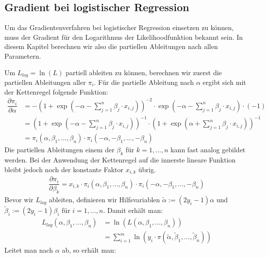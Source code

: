 \subsection{Gradient bei logistischer Regression}
\label{subsection:2:2:2}

Um das Gradientenverfahren bei logistischer Regression einsetzen zu können, muss der Gradient für den Logarithmus der Likelihoodfunktion bekannt sein. In diesem Kapitel berechnen wir also die partiellen Ableitungen nach allen Parametern.

Um $L_{log} = \ln(L)$ partiell ableiten zu können, berechnen wir zuerst die partiellen Ableitungen aller $\pi_i$. Für die partielle Ableitung nach $\alpha$ ergibt sich mit der Kettenregel folgende Funktion:
\begin{align*}
    \dfrac{\partial \pi_i}{\partial \alpha} &= - \left( 1 + \exp \left(- \alpha - \sum_{j=1}^n \beta_j \cdot x_{i, j} \right) \right)^{-2} \cdot \exp \left(- \alpha - \sum_{j=1}^n \beta_j \cdot x_{i, j} \right) \cdot (-1) \\
    &= \left( 1 + \exp \left(- \alpha - \sum_{j=1}^n \beta_j \cdot x_{i, j} \right) \right)^{-1} \cdot \left( 1 + \exp \left(\alpha + \sum_{j=1}^n \beta_j \cdot x_{i, j} \right) \right)^{-1} \\
    &= \pi_i(\alpha, \beta_1, \dots, \beta_n) \cdot \pi_i(- \alpha, - \beta_1, \dots, - \beta_n)
\end{align*}
Die partiellen Ableitungen einem der $\beta_k$ für $k = 1, \dots, n$ kann fast analog gebildet werden. Bei der Anwendung der Kettenregel auf die innerste lineare Funktion bleibt jedoch noch der konstante Faktor $x_{i, k}$ übrig.
\begin{align*}
    \dfrac{\partial \pi_i}{\partial \beta_k} = x_{i, k} \cdot \pi_i(\alpha, \beta_1, \dots, \beta_n) \cdot \pi_i(- \alpha, - \beta_1, \dots, - \beta_n)
\end{align*}
Bevor wir $L_{log}$ ableiten, definieren wir Hilfsvariablen $\tilde\alpha := (2 y_i - 1) \alpha$ und $\tilde\beta_i := (2 y_i - 1) \beta_i$ für $i = 1, \dots, n$. Damit erhält man:
\begin{align*}
    L_{log}(\alpha, \beta_1, \dots, \beta_n) &= \ln(L(\alpha, \beta_1, \dots, \beta_n)) \\
    &= \sum_{i=1}^m \ln \left(y_i \cdot \pi(\tilde\alpha, \tilde\beta_1, \dots, \tilde\beta_n) \right)
\end{align*}
Leitet man nach $\alpha$ ab, so erhält man:
